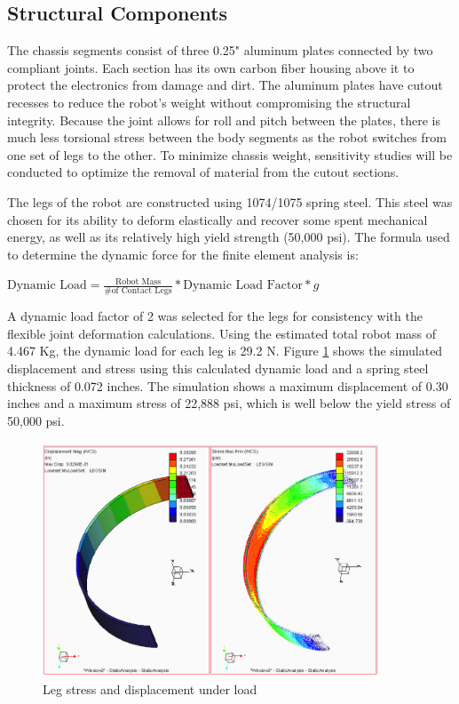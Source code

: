 \documentclass[11pt]{article}
\begin{document}
\subsection{Structural Components}

The chassis segments consist of three 0.25" aluminum plates connected by two compliant joints. Each section has its own carbon fiber housing above it to protect the electronics from damage and dirt.  The aluminum plates have cutout recesses to reduce the robot's weight without compromising the structural integrity.  Because the joint allows for roll and pitch between the plates, there is much less torsional stress between the body segments as the robot switches from one set of legs to the other.  To minimize chassis weight, sensitivity studies will be conducted to optimize the removal of material from the cutout sections.

The legs of the robot are constructed using 1074/1075 spring steel.  This steel was chosen for its ability to deform elastically and recover some spent mechanical energy, as well as its relatively high yield strength (50,000 psi).  The formula used to determine the dynamic force for the finite element analysis is:

\begin{center}
$ \text{Dynamic Load} = \frac{\text{Robot Mass}}{\text{\# of Contact Legs}}*\text{Dynamic Load Factor}*g $
\end{center}

A dynamic load factor of 2 was selected for the legs for consistency with the flexible joint deformation calculations.  Using the estimated total robot mass of 4.467 Kg, the dynamic load for each leg is 29.2 N.  Figure \ref{fig:legstress} shows the simulated displacement and stress using this calculated dynamic load and a spring steel thickness of 0.072 inches.  The simulation shows a maximum displacement of 0.30 inches and a maximum stress of 22,888 psi, which is well below the yield stress of 50,000 psi.

\begin{figure}[h]
\centering
\includegraphics[width=10cm,height=7cm]{leg_analysis.png}
\caption{Leg stress and displacement under load}
\label{fig:legstress}
\end{figure}
\end{document}
